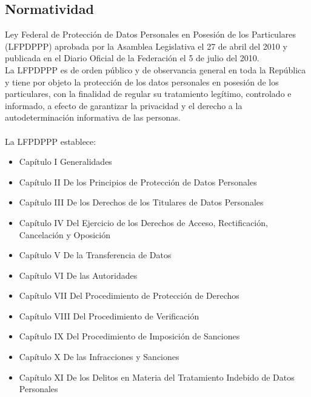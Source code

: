 \subsection{Normatividad}

    Ley Federal de Protección de Datos Personales en Posesión de los Particulares (LFPDPPP) aprobada por la Asamblea Legislativa el 27 de abril del 2010 y publicada en el Diario Oficial de la Federación el 5 de julio del 2010.\\
    
    La LFPDPPP es de orden público y de observancia general en toda la República y
    tiene por objeto la protección de los datos personales en posesión de los particulares, con la finalidad de regular su tratamiento legítimo, controlado e informado, a efecto de garantizar la privacidad y el derecho a
    la autodeterminación informativa de las personas\cite{Personas_Normatividad}.\\\\
    La LFPDPPP establece:
     \begin{itemize}
      \item Capítulo I Generalidades
      \item Capítulo II De los Principios de Protección de Datos Personales
      \item Capítulo III De los Derechos de los Titulares de Datos Personales
      \item Capítulo IV Del Ejercicio de los Derechos de Acceso, Rectificación, Cancelación y Oposición
      \item Capítulo V De la Transferencia de Datos
      \item Capítulo VI De las Autoridades
      \item Capítulo VII Del Procedimiento de Protección de Derechos
      \item Capítulo VIII Del Procedimiento de Verificación
      \item Capítulo IX Del Procedimiento de Imposición de Sanciones
      \item Capítulo X De las Infracciones y Sanciones
      \item Capítulo XI De los Delitos en Materia del Tratamiento Indebido de Datos Personales
    \end{itemize}
    

